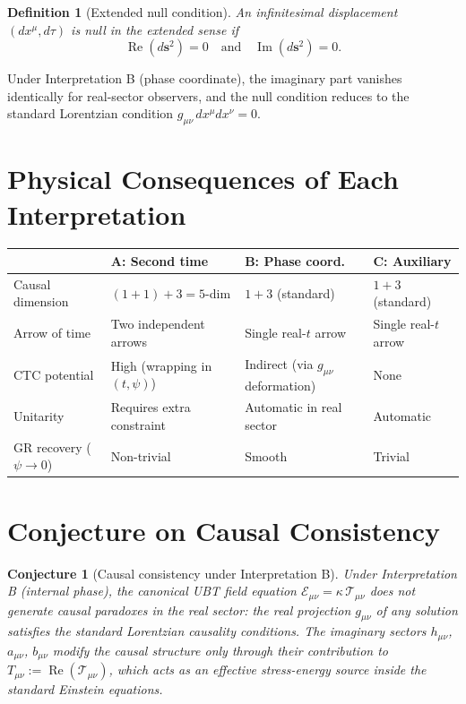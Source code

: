 \documentclass[12pt]{article}
\newtheorem{conjecture}{Conjecture}
\newtheorem{definition}{Definition}
\begin{document}
\begin{definition}[Extended null condition]
An infinitesimal displacement $(dx^\mu, d\tau)$ is \emph{null in the
extended sense} if
\begin{equation}
  \operatorname{Re}(d\mathbf{s}^2) = 0
  \quad\text{and}\quad
  \operatorname{Im}(d\mathbf{s}^2) = 0.
\end{equation}
\end{definition}

Under Interpretation B (phase coordinate), the imaginary part vanishes
identically for real-sector observers, and the null condition reduces to
the standard Lorentzian condition $g_{\mu\nu}\,dx^\mu dx^\nu = 0$.

\section{Physical Consequences of Each Interpretation}
\begin{center}
\renewcommand{\arraystretch}{1.4}
\begin{tabular}{|l|p{4.2cm}|p{4.2cm}|p{4.2cm}|}
\hline
 & \textbf{A: Second time} & \textbf{B: Phase coord.} & \textbf{C: Auxiliary}\\
\hline
Causal dimension & $(1+1)+3 = 5$-dim & $1+3$ (standard) & $1+3$ (standard)\\
Arrow of time & Two independent arrows & Single real-$t$ arrow & Single real-$t$ arrow\\
CTC potential & High (wrapping in $(t,\psi)$) & Indirect (via $g_{\mu\nu}$ deformation) & None\\
Unitarity & Requires extra constraint & Automatic in real sector & Automatic\\
GR recovery ($\psi\to 0$) & Non-trivial & Smooth & Trivial\\
\hline
\end{tabular}
\end{center}

\section{Conjecture on Causal Consistency}
\begin{conjecture}[Causal consistency under Interpretation B]
\label{conj:causal_consistency}
Under Interpretation B (internal phase), the canonical UBT field equation
$\mathcal{E}_{\mu\nu} = \kappa\,\mathcal{T}_{\mu\nu}$ does not generate
causal paradoxes in the real sector: the real projection $g_{\mu\nu}$ of
any solution satisfies the standard Lorentzian causality conditions.
The imaginary sectors $h_{\mu\nu}$, $a_{\mu\nu}$, $b_{\mu\nu}$ modify
the causal structure only through their contribution to $T_{\mu\nu} :=
\operatorname{Re}(\mathcal{T}_{\mu\nu})$, which acts as an effective
stress-energy source inside the standard Einstein equations.
\end{conjecture}
\end{document}
